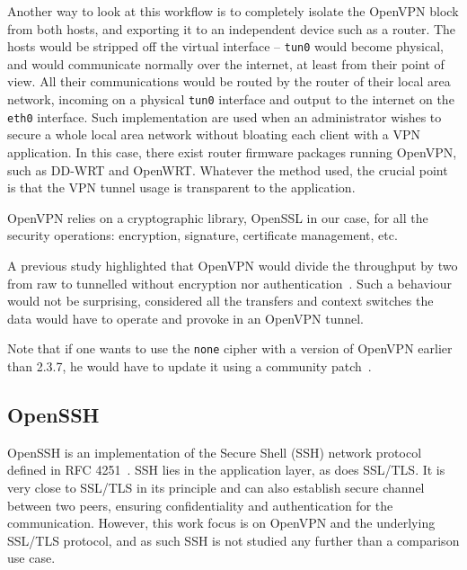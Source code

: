 Another way to look at this workflow is to completely isolate the OpenVPN block from both hosts, and exporting it to an independent device such as a router.
The hosts would be stripped off the virtual interface -- \texttt{tun0} would become physical, and would communicate normally over the internet, at least from their point of view.
All their communications would be routed by the router of their local area network, incoming on a physical \texttt{tun0} interface and output to the internet on the \texttt{eth0} interface.
Such implementation are used when an administrator wishes to secure a whole local area network without bloating each client with a VPN application.
In this case, there exist router firmware packages running OpenVPN, such as DD-WRT and OpenWRT.
Whatever the method used, the crucial point is that the VPN tunnel usage is transparent to the application.\newline{}

OpenVPN relies on a cryptographic library, OpenSSL in our case, for all the security operations: encryption, signature, certificate management, etc.\newline{}

A previous study highlighted that OpenVPN would divide the throughput by two from raw to tunnelled without encryption nor authentication~\cite{Hoekstra2011}.
Such a behaviour would not be surprising, considered all the transfers and context switches the data would have to operate and provoke in an OpenVPN tunnel.

\noindent Note that if one wants to use the \texttt{none} cipher with a version of OpenVPN earlier than 2.3.7, he would have to update it using a community patch~\cite{openvpn-patch-none}.


\subsection{OpenSSH}
OpenSSH is an implementation of the Secure Shell (SSH) network protocol defined in RFC 4251~\cite{rfc4251}.
SSH lies in the application layer, as does SSL/TLS.
It is very close to SSL/TLS in its principle and can also establish secure channel between two peers, ensuring confidentiality and authentication for the communication.
However, this work focus is on OpenVPN and the underlying SSL/TLS protocol, and as such SSH is not studied any further than a comparison use case.\newline{}

